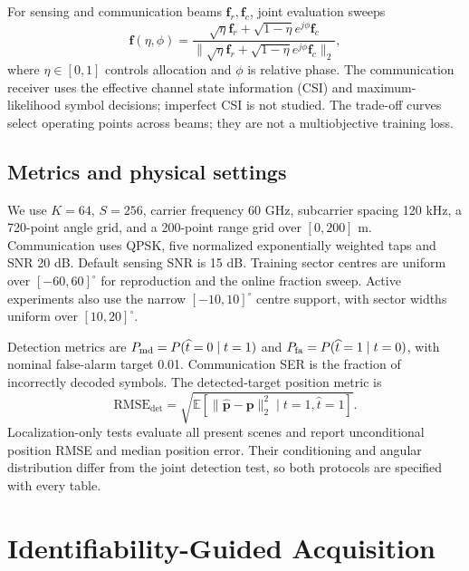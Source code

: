 \documentclass[conference]{IEEEtran}
\newcommand{\E}{\mathbb{E}}
\begin{document}
For sensing and communication beams $\mathbf f_r,\mathbf f_c$, joint evaluation sweeps
\begin{equation}
 \mathbf f(\eta,\phi)=
 \frac{\sqrt\eta\mathbf f_r+\sqrt{1-\eta}e^{j\phi}\mathbf f_c}
 {\|\sqrt\eta\mathbf f_r+\sqrt{1-\eta}e^{j\phi}\mathbf f_c\|_2},
\end{equation}
where $\eta\in[0,1]$ controls allocation and $\phi$ is relative phase. The communication receiver uses the effective channel state information (CSI) and maximum-likelihood symbol decisions; imperfect CSI is not studied. The trade-off curves select operating points across beams; they are not a multiobjective training loss.

\subsection{Metrics and physical settings}
We use $K=64$, $S=256$, carrier frequency 60 GHz, subcarrier spacing 120 kHz, a 720-point angle grid, and a 200-point range grid over $[0,200]$ m. Communication uses QPSK, five normalized exponentially weighted taps and SNR 20 dB. Default sensing SNR is 15 dB. Training sector centres are uniform over $[-60,60]^\circ$ for reproduction and the online fraction sweep. Active experiments also use the narrow $[-10,10]^\circ$ centre support, with sector widths uniform over $[10,20]^\circ$.

Detection metrics are $P_{\rm md}=P(\widehat t=0\mid t=1)$ and $P_{\rm fa}=P(\widehat t=1\mid t=0)$, with nominal false-alarm target 0.01. Communication SER is the fraction of incorrectly decoded symbols. The detected-target position metric is
\begin{equation}
 \mathrm{RMSE}_{\mathrm{det}}=\sqrt{\E[\|\widehat{\mathbf p}-\mathbf p\|_2^2\mid t=1,\widehat t=1]}.
\end{equation}
Localization-only tests evaluate all present scenes and report unconditional position RMSE and median position error. Their conditioning and angular distribution differ from the joint detection test, so both protocols are specified with every table.
\section{Identifiability-Guided Acquisition}
\end{document}
